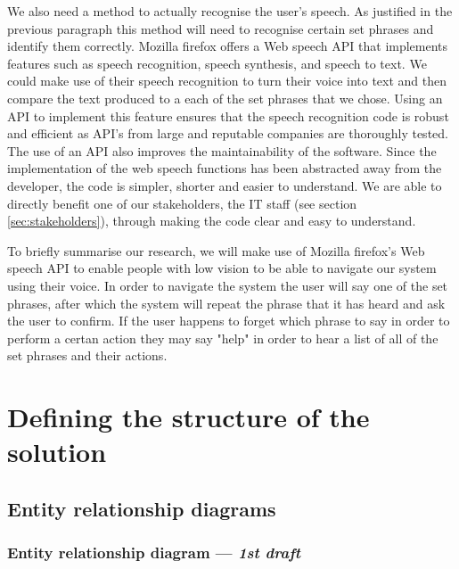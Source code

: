 We also need a method to actually recognise the user's speech.
As justified in the previous paragraph this method will need
to recognise certain set phrases and identify them correctly.
Mozilla firefox offers a Web speech API that implements 
features such as speech recognition, speech synthesis, and
speech to text. We could make use of their speech recognition
to turn their voice into text and then compare the text
produced to a each of the set phrases that we chose. Using an
API to implement this feature ensures that the speech recognition
code is robust and efficient as API's from large and reputable
companies are thoroughly tested. The use of an API also 
improves the maintainability of the software. Since the
implementation of the web speech functions has been abstracted 
away from the developer, the code is simpler, shorter and easier
to understand. We are able to directly benefit one of our
stakeholders, the IT staff (see section \ref{sec:stakeholders}),
through making the code clear and easy to understand.\\ \vspace{0.2cm}

To briefly summarise our research, we will make use of Mozilla
firefox's Web speech API to enable people with low vision to be 
able to navigate our system using their voice. In order to navigate
the system the user will say one of the set phrases, after which the 
system will repeat the phrase that it has heard and ask the user 
to confirm. If the user happens to forget which phrase to say in 
order to perform a certan action they may say "help" in order to 
hear a list of all of the set phrases and their actions.

\section{Defining the structure of the solution}

\subsection{Entity relationship diagrams}

\subsubsection{Entity relationship diagram — \textit{1st draft}}
\label{sec:erdd}


